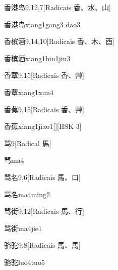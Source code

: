 \begin{entry}{香港岛}{9,12,7}[Radicais ⾹、⽔、⼭]
  \begin{phonetics}{香港岛}{xiang1gang3 dao3}
  \end{phonetics}
\end{entry}

\begin{entry}{香槟酒}{9,14,10}[Radicais ⾹、⽊、⾣]
  \begin{phonetics}{香槟酒}{xiang1bin1jiu3}
  \end{phonetics}
\end{entry}

\begin{entry}{香蕈}{9,15}[Radicais ⾹、⾋]
  \begin{phonetics}{香蕈}{xiang1xun4}
  \end{phonetics}
\end{entry}

\begin{entry}{香蕉}{9,15}[Radicais ⾹、⾋]
  \begin{phonetics}{香蕉}{xiang1jiao1}[][HSK 3]
  \end{phonetics}
\end{entry}

\begin{entry}{骂}{9}[Radical ⾺]
  \begin{phonetics}{骂}{ma4}
  \end{phonetics}
\end{entry}

\begin{entry}{骂名}{9,6}[Radicais ⾺、⼝]
  \begin{phonetics}{骂名}{ma4ming2}
  \end{phonetics}
\end{entry}

\begin{entry}{骂街}{9,12}[Radicais ⾺、⾏]
  \begin{phonetics}{骂街}{ma4jie1}
  \end{phonetics}
\end{entry}

\begin{entry}{骆驼}{9,8}[Radicais ⾺、⾺]
  \begin{phonetics}{骆驼}{luo4tuo5}
  \end{phonetics}
\end{entry}

